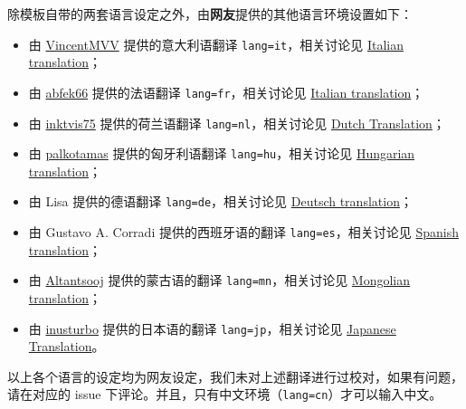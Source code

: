 \documentclass[lang=cn,10pt]{elegantbook}
\begin{document}
除模板自带的两套语言设定之外，由\textbf{网友}提供的其他语言环境设置如下：
\begin{itemize}
  \item 由 \href{https://github.com/VincentMVV}{VincentMVV} 提供的意大利语翻译 \lstinline{lang=it}，相关讨论见 \href{https://github.com/ElegantLaTeX/ElegantBook/issues/85}{Italian translation}；
  \item 由 \href{https://github.com/abfek66}{abfek66} 提供的法语翻译 \lstinline{lang=fr}，相关讨论见 \href{https://github.com/ElegantLaTeX/ElegantBook/issues/85}{Italian translation}；
  \item 由 \href{https://github.com/inktvis75}{inktvis75} 提供的荷兰语翻译 \lstinline{lang=nl}，相关讨论见 \href{https://github.com/ElegantLaTeX/ElegantBook/issues/108}{Dutch Translation}；
  \item 由 \href{https://github.com/palkotamas}{palkotamas} 提供的匈牙利语翻译 \lstinline{lang=hu}，相关讨论见 \href{https://github.com/ElegantLaTeX/ElegantBook/issues/111}{Hungarian translation}；
  \item 由 Lisa 提供的德语翻译 \lstinline{lang=de}，相关讨论见 \href{https://github.com/ElegantLaTeX/ElegantBook/issues/113}{Deutsch translation}；
  \item 由 Gustavo A. Corradi 提供的西班牙语的翻译 \lstinline{lang=es}，相关讨论见 \href{https://github.com/ElegantLaTeX/ElegantBook/issues/133}{Spanish translation}；
  \item 由 \href{https://github.com/Altantsooj}{Altantsooj} 提供的蒙古语的翻译 \lstinline{lang=mn}，相关讨论见 \href{https://github.com/ElegantLaTeX/ElegantBook/issues/137}{Mongolian translation}；
  \item 由 \href{https://github.com/inusturbo}{inusturbo} 提供的日本语的翻译 \lstinline{lang=jp}，相关讨论见 \href{https://github.com/ElegantLaTeX/ElegantBook/issues/172}{Japanese Translation}。
\end{itemize}



\begin{remark}
以上各个语言的设定均为网友设定，我们未对上述翻译进行过校对，如果有问题，请在对应的 issue 下评论。并且，只有中文环境（\lstinline{lang=cn}）才可以输入中文。
\end{remark}
\end{document}
